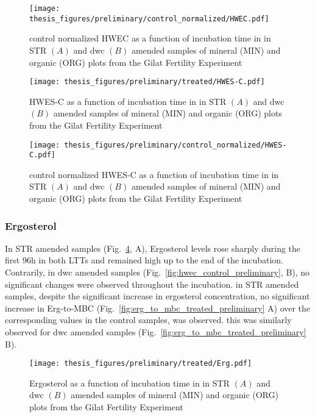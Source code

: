 \documentclass[12pt]{report}
\begin{document}
		\begin{figure}[H]
			\centering
			\texttt{[image: thesis\_figures/preliminary/control\_normalized/HWEC.pdf]}
			\caption{control normalized HWEC  as a function of incubation time in in STR $\left(A\right)$ and \gls{dwc} $\left(B\right)$ amended samples of mineral (MIN) and organic (ORG) plots from the Gilat Fertility Experiment}
			\label{fig:nor_hwec_treated_preliminary}
		\end{figure}
		
		\begin{figure}[H]
			\centering
			\texttt{[image: thesis\_figures/preliminary/treated/HWES-C.pdf]}
			\caption{HWES-C  as a function of incubation time in in STR $\left(A\right)$ and \gls{dwc} $\left(B\right)$ amended samples of mineral (MIN) and organic (ORG) plots from the Gilat Fertility Experiment}
			\label{fig:hwes-c_treated_preliminary}
		\end{figure}
		
		
		\begin{figure}[H]
			\centering
			\texttt{[image: thesis\_figures/preliminary/control\_normalized/HWES-C.pdf]}
			\caption{control normalized HWES-C  as a function of incubation time in in STR $\left(A\right)$ and \gls{dwc} $\left(B\right)$ amended samples of mineral (MIN) and organic (ORG) plots from the Gilat Fertility Experiment}
			\label{fig:nor_hwes-c_treated_preliminary}
		\end{figure}
		
		\subsubsection{Ergosterol}
		In STR amended samples (Fig.\ \ref{fig:erg_treated_preliminary}, A), Ergosterol levels rose sharply during the first 96h in both LTTs and remained high up to the end of the incubation. Contrarily, in \gls{dwc} amended samples (Fig.\ \ref{fig:hwec_control_preliminary}, B), no significant changes were observed throughout the incubation. in STR amended samples, despite the significant increase in ergosterol concentration, no significant increase in Erg-to-MBC (Fig.\ \ref{fig:erg_to_mbc_treated_preliminary} A) over the corresponding values in the control samples, was observed. this was similarly observed for \gls{dwc} amended samples (Fig.\ \ref{fig:erg_to_mbc_treated_preliminary} B).
		
		\begin{figure}[H]
			\centering
			\texttt{[image: thesis\_figures/preliminary/treated/Erg.pdf]}
			\caption{Ergosterol  as a function of incubation time in in STR $\left(A\right)$ and \gls{dwc} $\left(B\right)$ amended samples of mineral (MIN) and organic (ORG) plots from the Gilat Fertility Experiment}
			\label{fig:erg_treated_preliminary}
		\end{figure}
		
\end{document}
